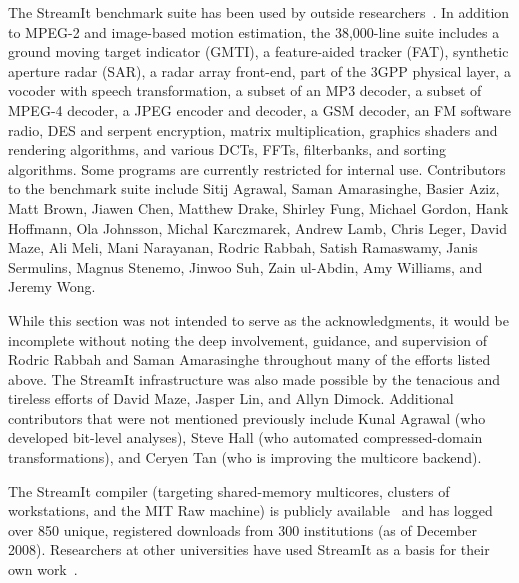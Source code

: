 The StreamIt benchmark suite has been used by outside
researchers~\cite{kudlur_orchestratingexecution_2008}.
In addition to MPEG-2 and image-based motion estimation, the
38,000-line suite includes a ground moving target indicator (GMTI), a
feature-aided tracker (FAT), synthetic aperture radar (SAR), a radar
array front-end, part of the 3GPP physical layer, a vocoder with
speech transformation, a subset of an MP3 decoder, a subset of MPEG-4
decoder, a JPEG encoder and decoder, a GSM decoder, an FM software
radio, DES and serpent encryption, matrix multiplication, graphics
shaders and rendering algorithms, and various DCTs, FFTs, filterbanks,
and sorting algorithms.  Some programs are currently restricted for
internal use.
Contributors to the benchmark suite include Sitij Agrawal, Saman
Amarasinghe, Basier Aziz, Matt Brown, Jiawen Chen, Matthew Drake,
Shirley Fung, Michael Gordon, Hank Hoffmann, Ola Johnsson, Michal
Karczmarek, Andrew Lamb, Chris Leger, David Maze, Ali Meli, Mani
Narayanan, Rodric Rabbah, Satish Ramaswamy, Janis Sermulins, Magnus
Stenemo, Jinwoo Suh, Zain ul-Abdin, Amy Williams, and Jeremy Wong.


While this section was not intended to serve as the acknowledgments,
it would be incomplete without noting the deep involvement, guidance,
and supervision of Rodric Rabbah and Saman Amarasinghe throughout many
of the efforts listed above.  The StreamIt infrastructure was also
made possible by the tenacious and tireless efforts of David Maze,
Jasper Lin, and Allyn Dimock.  Additional contributors that were not
mentioned previously include Kunal Agrawal (who developed bit-level
analyses), Steve Hall (who automated compressed-domain
transformations), and Ceryen Tan (who is improving the multicore
backend).

The StreamIt compiler (targeting shared-memory multicores, clusters of
workstations, and the MIT Raw machine) is publicly
available~\cite{streamitweb} and has logged over 850 unique,
registered downloads from 300 institutions (as of December 2008).
Researchers at other universities have used StreamIt as a basis for
their own
work~\cite{mani-permutations,bit-streaming,ola-techrep,duca-thesis,won-thesis}.

